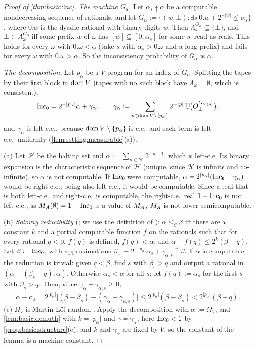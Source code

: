 \begin{proof}[Proof of \cref{thm:basic:inc}]
\emph{The machine $G_\alpha$.} Let $\alpha_s\uparrow\alpha$ be a computable nondecreasing sequence of rationals, and let $G_\alpha:=\{(w,\bot):\exists s\ 0.w+2^{-\lvert w\rvert}\le\alpha_s\}$, where $0.w$ is the dyadic rational with binary digits $w$. Then $A^{G_\alpha}_\omega\subseteq\{\bot\}$, and $\bot\in A^{G_\alpha}_\omega$ iff some prefix $w$ of $\omega$ has $[w]\subseteq[0,\alpha_s]$ for some $s$, read as reals. This holds for every $\omega$ with $0.\omega<\alpha$ (take $s$ with $\alpha_s>0.\omega$ and a long prefix) and fails for every $\omega$ with $0.\omega>\alpha$. So the inconsistency probability of $G_\alpha$ is $\alpha$.

\emph{The decomposition.} Let $p_\alpha$ be a $V$-program for an index of $G_\alpha$. Splitting the tapes by their first block in $\operatorname{dom} V$ (tapes with no such block have $A_\omega=\emptyset$, which is consistent),
\[
\mathrm{Inc}_0=2^{-\lvert p_\alpha\rvert}\alpha+\gamma_\alpha,\qquad\gamma_\alpha:=\sum_{p\in\operatorname{dom} V\setminus\{p_\alpha\}}2^{-\lvert p\rvert}\,\mathbb{U}\big(O^{G_{V(p)}}_\bot\big),
\]
and $\gamma_\alpha$ is left-c.e., because $\operatorname{dom} V\setminus\{p_\alpha\}$ is c.e.\ and each term is left-c.e.\ uniformly (\cref{lem:setting:measurable}(a)).

(a) Let $\mathcal H$ be the halting set and $\alpha:=\sum_{n\in\mathcal H}2^{-n-1}$, which is left-c.e. Its binary expansion is the characteristic sequence of $\mathcal H$ (unique, since $\mathcal H$ is infinite and co-infinite), so $\alpha$ is not computable. If $\mathrm{Inc}_0$ were computable, $\alpha=2^{\lvert p_\alpha\rvert}(\mathrm{Inc}_0-\gamma_\alpha)$ would be right-c.e.; being also left-c.e., it would be computable. Since a real that is both left-c.e.\ and right-c.e.\ is computable, the right-c.e.\ real $1-\mathrm{Inc}_0$ is not left-c.e.; as $M_{A}(\emptyset)=1-\mathrm{Inc}_0$ is a value of $M_{A}$, $M_{A}$ is not lower semicomputable.

(b) \emph{Solovay reducibility} (\citealp{solovay1975draft}; we use the definition of \citealp{downey2010algorithmic}): $\alpha\le_S\beta$ iff there are a constant $k$ and a partial computable function $f$ on the rationals such that for every rational $q<\beta$, $f(q)$ is defined, $f(q)<\alpha$, and $\alpha-f(q)\le2^k(\beta-q)$. Let $\beta:=\mathrm{Inc}_0$, with approximations $\beta_s:=2^{-\lvert p_\alpha\rvert}\alpha_s+\gamma_{\alpha,s}\uparrow\beta$. If $\alpha$ is computable the reduction is trivial: given $q<\beta$, find $s$ with $\beta_s>q$ and output a rational in $(\alpha-(\beta_s-q),\alpha)$. Otherwise $\alpha_s<\alpha$ for all $s$; let $f(q):=\alpha_s$ for the first $s$ with $\beta_s>q$. Then, since $\gamma_\alpha-\gamma_{\alpha,s}\ge0$,
\[
\alpha-\alpha_s=2^{\lvert p_\alpha\rvert}\big[(\beta-\beta_s)-(\gamma_\alpha-\gamma_{\alpha,s})\big]\le2^{\lvert p_\alpha\rvert}(\beta-\beta_s)<2^{\lvert p_\alpha\rvert}(\beta-q).
\]
(c) $\Omega_V$ is Martin-L\"of random \citep{chaitin1975theory}. Apply the decomposition with $\alpha:=\Omega_V$, and \cref{lem:basic:demuth} with $k=\lvert p_\alpha\rvert$ and $\gamma=\gamma_\alpha$; here $\mathrm{Inc}_0<1$ by \cref{prop:basic:structure}(e), and $k$ and $\gamma_\alpha$ are fixed by $V$, so the constant of the lemma is a machine constant.
\end{proof}

